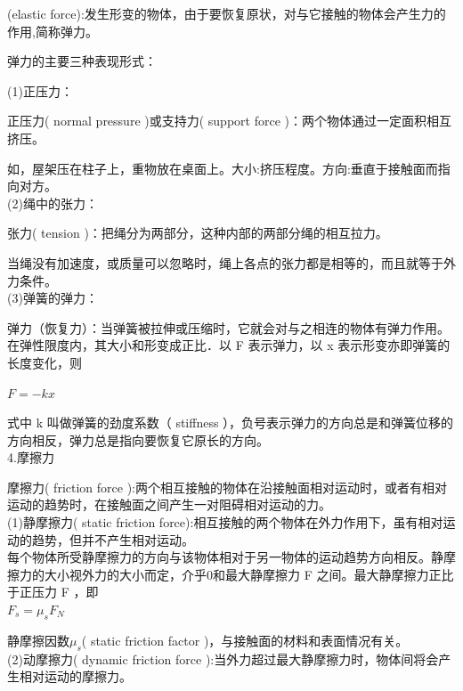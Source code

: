 \begin{definition}[弹力](elastic force):发生形变的物体，由于要恢复原状，对与它接触的物体会产生力的作用,简称弹力。
\end{definition}

弹力的主要三种表现形式：

(1)正压力：

正压力( normal pressure )或支持力( support force )：两个物体通过一定面积相互挤压。

{\small	如，屋架压在柱子上，重物放在桌面上。大小:挤压程度。方向:垂直于接触面而指向对方。}\\

(2)绳中的张力：

张力( tension )：把绳分为两部分，这种内部的两部分绳的相互拉力。

当绳没有加速度，或质量可以忽略时，绳上各点的张力都是相等的，而且就等于外力条件。\\

(3)弹簧的弹力：

弹力（恢复力）：当弹簧被拉伸或压缩时，它就会对与之相连的物体有弹力作用。在弹性限度内，其大小和形变成正比．以 F 表示弹力，以 x 表示形变亦即弹簧的长度变化，则

$	F =- kx  $

式中 k 叫做弹簧的劲度系数（ stiffness ），负号表示弹力的方向总是和弹簧位移的方向相反，弹力总是指向要恢复它原长的方向。\\

4.摩擦力

摩擦力( friction force ):两个相互接触的物体在沿接触面相对运动时，或者有相对运动的趋势时，在接触面之间产生一对阻碍相对运动的力。\\

(1)静摩擦力( static friction force):相互接触的两个物体在外力作用下，虽有相对运动的趋势，但并不产生相对运动。\\

每个物体所受静摩擦力的方向与该物体相对于另一物体的运动趋势方向相反。静摩擦力的大小视外力的大小而定，介乎0和最大静摩擦力 F 之间。最大静摩擦力正比于正压力 F ，即\\

$	F_{s}=\mu_{s} F_{N}   $

静摩擦因数$\mu_{s}$( static friction factor )，与接触面的材料和表面情况有关。\\

(2)动摩擦力( dynamic friction force ):当外力超过最大静摩擦力时，物体间将会产生相对运动的摩擦力。\\

